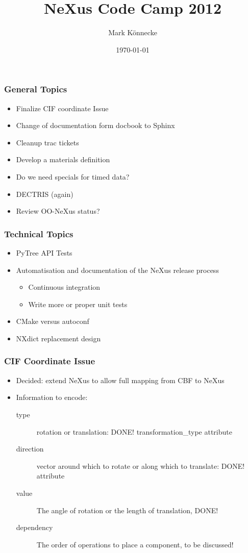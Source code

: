 \documentclass{beamer}
\title{NeXus Code Camp 2012}
\author{Mark K\"onnecke }
\institute{Paul Scherrer Institute\\Switzerland }
\date{\today}
\begin{document}
\begin{frame}
\titlepage
\end{frame}

\begin{frame}
\frametitle{General Topics}
\begin{itemize}
\item Finalize CIF coordinate Issue
\item Change of documentation form docbook to Sphinx
\item Cleanup trac tickets
\item Develop a materials definition
\item Do we need specials for timed data?
\item DECTRIS (again) 
\item Review OO-NeXus status?
\end{itemize}
\end{frame}

\begin{frame}
\frametitle{Technical Topics}
\begin{itemize}
\item PyTree API Tests
\item Automatisation and documentation of the NeXus release process
\begin{itemize}
\item Continuous integration
\item Write more or proper unit tests
\end{itemize}
\item CMake versus autoconf
\item NXdict replacement design
\end{itemize}
\end{frame}

\begin{frame} \frametitle{CIF Coordinate Issue }
\begin{itemize}
\item Decided: extend NeXus to allow full mapping from CBF to NeXus
\item Information to encode:
\begin{description}
\item[type] rotation or translation: DONE! transformation\_type attribute
\item[direction] vector around which to rotate or along which to translate: DONE! attribute
\item[value] The angle of rotation or the length of translation, DONE!
\item[dependency] The order of operations to place a component, to be discussed!
\end{description}
\end{itemize}
\end{frame}
\end{document}
